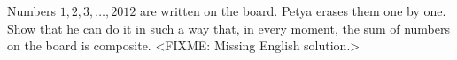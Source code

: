 \problem
Numbers $1, 2, 3, \ldots, 2012$ are written on the board.
Petya erases them one by one.
Show that he can do it in such a way that, in every moment, the sum of numbers
on the board is composite.
\solution
<FIXME: Missing English solution.>
\endproblem
